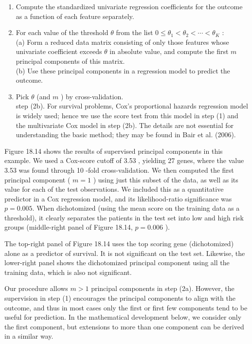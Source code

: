 \documentclass[10pt]{article}
\begin{document}
\begin{enumerate}
  \item Compute the standardized univariate regression coefficients for the outcome as a function of each feature separately.
  \item For each value of the threshold $\theta$ from the list $0 \leq \theta_{1}<\theta_{2}<\cdots<\theta_{K}$ :\\
(a) Form a reduced data matrix consisting of only those features whose univariate coefficient exceeds $\theta$ in absolute value, and compute the first $m$ principal components of this matrix.\\
(b) Use these principal components in a regression model to predict the outcome.
  \item Pick $\theta$ (and $m$ ) by cross-validation.\\
step (2b). For survival problems, Cox's proportional hazards regression model is widely used; hence we use the score test from this model in step (1) and the multivariate Cox model in step (2b). The details are not essential for understanding the basic method; they may be found in Bair et al. (2006).
\end{enumerate}

Figure 18.14 shows the results of supervised principal components in this example. We used a Cox-score cutoff of 3.53 , yielding 27 genes, where the value 3.53 was found through 10 -fold cross-validation. We then computed the first principal component ( $m=1$ ) using just this subset of the data, as well as its value for each of the test observations. We included this as a quantitative predictor in a Cox regression model, and its likelihood-ratio significance was $p=0.005$. When dichotomized (using the mean score on the training data as a threshold), it clearly separates the patients in the test set into low and high risk groups (middle-right panel of Figure 18.14, $p=0.006$ ).

The top-right panel of Figure 18.14 uses the top scoring gene (dichotomized) alone as a predictor of survival. It is not significant on the test set. Likewise, the lower-right panel shows the dichotomized principal component using all the training data, which is also not significant.

Our procedure allows $m>1$ principal components in step (2a). However, the supervision in step (1) encourages the principal components to align with the outcome, and thus in most cases only the first or first few components tend to be useful for prediction. In the mathematical development below, we consider only the first component, but extensions to more than one component can be derived in a similar way.
\end{document}
